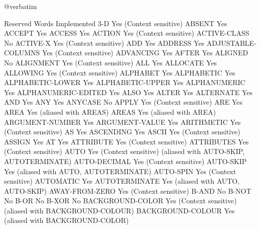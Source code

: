 @verbatim

Reserved Words                  Implemented
3-D                             Yes (Context sensitive)
ABSENT                          Yes
ACCEPT                          Yes
ACCESS                          Yes
ACTION                          Yes (Context sensitive)
ACTIVE-CLASS                    No
ACTIVE-X                        Yes (Context sensitive)
ADD                             Yes
ADDRESS                         Yes
ADJUSTABLE-COLUMNS              Yes (Context sensitive)
ADVANCING                       Yes
AFTER                           Yes
ALIGNED                         No
ALIGNMENT                       Yes (Context sensitive)
ALL                             Yes
ALLOCATE                        Yes
ALLOWING                        Yes (Context sensitive)
ALPHABET                        Yes
ALPHABETIC                      Yes
ALPHABETIC-LOWER                Yes
ALPHABETIC-UPPER                Yes
ALPHANUMERIC                    Yes
ALPHANUMERIC-EDITED             Yes
ALSO                            Yes
ALTER                           Yes
ALTERNATE                       Yes
AND                             Yes
ANY                             Yes
ANYCASE                         No
APPLY                           Yes (Context sensitive)
ARE                             Yes
AREA                            Yes (aliased with AREAS)
AREAS                           Yes (aliased with AREA)
ARGUMENT-NUMBER                 Yes
ARGUMENT-VALUE                  Yes
ARITHMETIC                      Yes (Context sensitive)
AS                              Yes
ASCENDING                       Yes
ASCII                           Yes (Context sensitive)
ASSIGN                          Yes
AT                              Yes
ATTRIBUTE                       Yes (Context sensitive)
ATTRIBUTES                      Yes (Context sensitive)
AUTO                            Yes (Context sensitive) (aliased with AUTO-SKIP, AUTOTERMINATE)
AUTO-DECIMAL                    Yes (Context sensitive)
AUTO-SKIP                       Yes (aliased with AUTO, AUTOTERMINATE)
AUTO-SPIN                       Yes (Context sensitive)
AUTOMATIC                       Yes
AUTOTERMINATE                   Yes (aliased with AUTO, AUTO-SKIP)
AWAY-FROM-ZERO                  Yes (Context sensitive)
B-AND                           No
B-NOT                           No
B-OR                            No
B-XOR                           No
BACKGROUND-COLOR                Yes (Context sensitive) (aliased with BACKGROUND-COLOUR)
BACKGROUND-COLOUR               Yes (aliased with BACKGROUND-COLOR)

